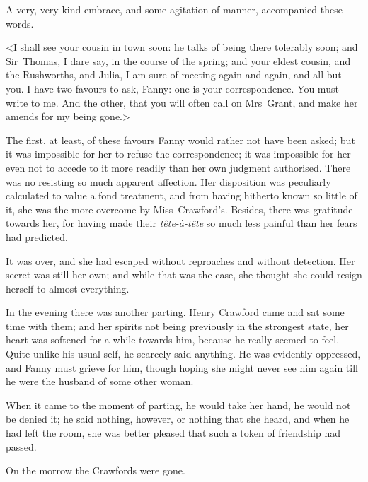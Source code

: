 A very, very kind embrace, and some agitation of manner, accompanied these words.

<I shall see your cousin in town soon: he talks of being there tolerably soon; and Sir~Thomas, I dare say, in the course of the spring; and your eldest cousin, and the Rushworths, and Julia, I am sure of meeting again and again, and all but you. I have two favours to ask, Fanny: one is your correspondence. You must write to me. And the other, that you will often call on Mrs~Grant, and make her amends for my being gone.>

The first, at least, of these favours Fanny would rather not have been asked; but it was impossible for her to refuse the correspondence; it was impossible for her even not to accede to it more readily than her own judgment authorised. There was no resisting so much apparent affection. Her disposition was peculiarly calculated to value a fond treatment, and from having hitherto known so little of it, she was the more overcome by Miss~Crawford's. Besides, there was gratitude towards her, for having made their \textit{tête-à-tête}  so much less painful than her fears had predicted.

It was over, and she had escaped without reproaches and without detection. Her secret was still her own; and while that was the case, she thought she could resign herself to almost everything.

In the evening there was another parting. Henry Crawford came and sat some time with them; and her spirits not being previously in the strongest state, her heart was softened for a while towards him, because he really seemed to feel. Quite unlike his usual self, he scarcely said anything. He was evidently oppressed, and Fanny must grieve for him, though hoping she might never see him again till he were the husband of some other woman.

When it came to the moment of parting, he would take her hand, he would not be denied it; he said nothing, however, or nothing that she heard, and when he had left the room, she was better pleased that such a token of friendship had passed.

On the morrow the Crawfords were gone. 